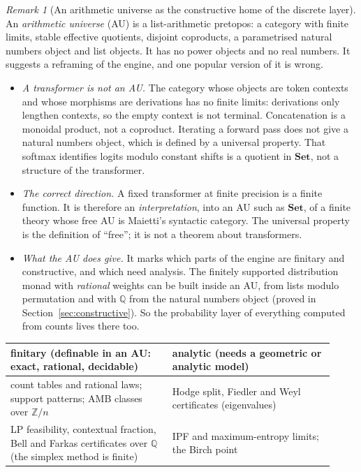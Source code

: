 \documentclass[11pt]{article}
\theoremstyle{definition}
\theoremstyle{remark}
\newtheorem{remark}[theorem]{Remark}
\begin{document}
\begin{remark}[An arithmetic universe as the constructive home of the discrete layer]\label{rem:au}
An \emph{arithmetic universe} (AU) \cite{joyal73,maietti10} is a list-arithmetic pretopos: a category with finite limits, stable effective quotients, disjoint coproducts, a parametrised natural numbers object and list objects. It has no power objects and no real numbers. It suggests a reframing of the engine, and one popular version of it is wrong.
\begin{itemize}
  \item \emph{A transformer is not an AU.} The category whose objects are token contexts and whose morphisms are derivations has no finite limits: derivations only lengthen contexts, so the empty context is not terminal. Concatenation is a monoidal product, not a coproduct. Iterating a forward pass does not give a natural numbers object, which is defined by a universal property. That softmax identifies logits modulo constant shifts is a quotient in $\mathbf{Set}$, not a structure of the transformer.
  \item \emph{The correct direction.} A fixed transformer at finite precision is a finite function. It is therefore an \emph{interpretation}, into an AU such as $\mathbf{Set}$, of a finite theory whose free AU is Maietti's syntactic category. The universal property is the definition of ``free''; it is not a theorem about transformers.
  \item \emph{What the AU does give.} It marks which parts of the engine are finitary and constructive, and which need analysis. The finitely supported distribution monad with \emph{rational} weights can be built inside an AU, from lists modulo permutation and with $\mathbb Q$ from the natural numbers object (proved in Section~\ref{sec:constructive}). So the probability layer of everything computed from counts lives there too.
\end{itemize}
\begin{center}\small
\begin{tabular}{>{\raggedright\arraybackslash}p{0.46\linewidth}>{\raggedright\arraybackslash}p{0.46\linewidth}}
\toprule
finitary (definable in an AU: exact, rational, decidable) & analytic (needs a geometric or analytic model)\\
\midrule
count tables and rational laws; support patterns; AMB classes over $\mathbb Z/n$ & Hodge split, Fiedler and Weyl certificates (eigenvalues)\\
LP feasibility, contextual fraction, Bell and Farkas certificates over $\mathbb Q$ (the simplex method is finite) & IPF and maximum-entropy limits; the Birch point\\

\end{tabular}
\end{center}
\end{remark}
\end{document}
